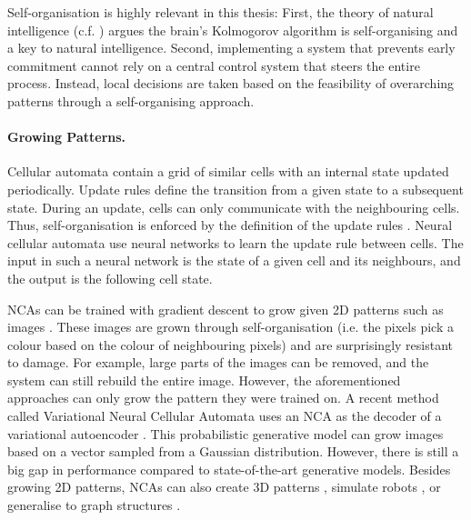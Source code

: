 Self-organisation is highly relevant in this thesis: First, the theory of natural intelligence (c.f. ) argues the brain's Kolmogorov algorithm is self-organising and a key to natural intelligence. Second, implementing a system that prevents early commitment cannot rely on a central control system that steers the entire process. Instead, local decisions are taken based on the feasibility of overarching patterns through a self-organising approach.

\paragraph{Growing Patterns.} Cellular automata contain a grid of similar cells with an internal state updated periodically.
Update rules define the transition from a given state to a subsequent state.
During an update, cells can only communicate with the neighbouring cells.
Thus, self-organisation is enforced by the definition of the update rules \cite{wolfram_cellular_1984, vichniac_simulating_1984}.
Neural cellular automata  use neural networks to learn the update rule between cells.
The input in such a neural network is the state of a given cell and its neighbours, and the output is the following cell state.

NCAs can be trained with gradient descent to grow given 2D patterns such as images .
These images are grown through self-organisation (i.e. the pixels pick a colour based on the colour of neighbouring pixels) and are surprisingly resistant to damage.
For example, large parts of the images can be removed, and the system can still rebuild the entire image.
However, the aforementioned approaches can only grow the pattern they were trained on.
A recent method called Variational Neural Cellular Automata  uses an NCA as the decoder of a variational autoencoder \cite{kingma_auto-encoding_2022}.
This probabilistic generative model can grow images based on a vector sampled from a Gaussian distribution.
However, there is still a big gap in performance compared to state-of-the-art generative models.
Besides growing 2D patterns, NCAs can also create 3D patterns , simulate robots , or generalise to graph structures .

